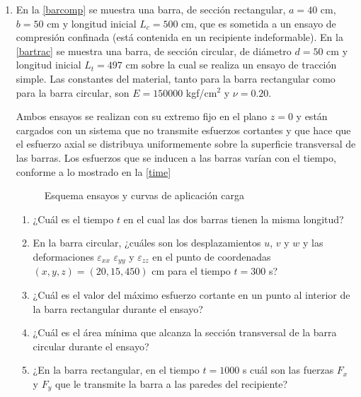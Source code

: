 \documentclass[../notas medios.tex]{subfiles}
\begin{document}
\begin{enumerate}
\item \label{punto08_m}  En la \cref{barcomp}  se muestra una barra, de sección rectangular, $a= 40$ cm, $b = 50$ cm y longitud inicial $L_{c} = 500$ cm, que es  sometida a un ensayo de compresión confinada (está contenida en un recipiente indeformable). En la \cref{bartrac} se muestra una barra, de sección circular, de diámetro $d = 50$ cm y longitud inicial $L_{t} =497$ cm sobre la cual se realiza  un ensayo de tracción simple. Las constantes del material, tanto para la barra rectangular como para la barra circular, son $E=150000$ kgf/cm$^2$ y $\nu=0.20$.

Ambos ensayos se realizan con su extremo fijo  en el plano $z = 0$ y están cargados con un sistema que no transmite esfuerzos cortantes y que hace que el esfuerzo axial se distribuya uniformemente sobre la superficie transversal de las barras. Los esfuerzos que se inducen a las barras varían con el tiempo, conforme a lo mostrado en la  \cref{time}
\begin{figure}[h]
	\centering
	\caption{Esquema ensayos y curvas de aplicación carga}
	\label{ensayo}
\end{figure}

\begin{enumerate}
	\item ¿Cuál es el tiempo $t$ en el cual las dos barras tienen la misma longitud? \\
	\item En la barra circular, ¿cuáles son los desplazamientos $u$, $v$ y $w$ y las deformaciones $\varepsilon_{xx}$ $\varepsilon_{yy}$ y $\varepsilon_{zz}$ en el punto de coordenadas $(x,y,z) = (20,15,450)$ cm para el tiempo $t = 300$ s?
	\item ¿Cuál es el valor del máximo esfuerzo cortante en un punto al interior de la barra rectangular durante el ensayo?
	\item  ¿Cuál es el área mínima que alcanza la sección transversal de la barra circular durante el ensayo?
	\item  ¿En la barra rectangular, en el tiempo $t=1000$ s cuál son las fuerzas $F_x$ y $F_y$ que le transmite la barra a las paredes del recipiente?
\end{enumerate}


\end{enumerate}
\end{document}
